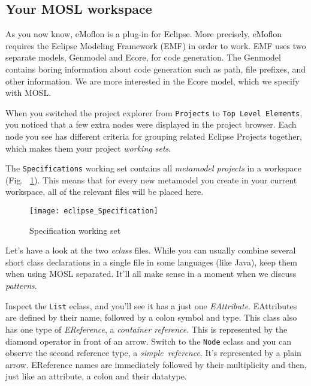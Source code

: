 \newpage
\texHeader

\subsection{Your MOSL workspace}

\hypertarget{projectStructure tex}{}
As you now know, eMoflon is a plug-in for Eclipse. More precisely, eMoflon requires the Eclipse Modeling Framework (EMF) in order to work. EMF uses two separate
models, Genmodel and Ecore, for code generation. The Genmodel contains boring information about code generation such as path, file prefixes, and other
information. We are more interested in the Ecore model, which we specify with MOSL.

When you switched the project explorer from \texttt{Projects} to \texttt{Top Level Elements}, you noticed that a few extra nodes were displayed in the project
browser. Each node you see has different criteria for grouping related Eclipse Projects together, which makes them your project \emph{working sets}.

The \texttt{Specifications} working set contains all \emph{metamodel projects} in a workspace (Fig. ~\ref{fig_modelSpecification}). This means that for every
new metamodel you create in your current workspace, all of the relevant files will be placed here.

 \begin{figure}[htbp]
  \centering
  \texttt{[image: eclipse\_Specification]}
  \caption{Specification working set}
  \label{fig_modelSpecification}
\end{figure}
  
Let's have a look at the two \emph{eclass} files. While you can usually combine several short class declarations in a single file in some languages (like Java),
keep them when using MOSL separated. It'll all make sense in a moment when we discuss \emph{patterns}.


Inspect the \texttt{List} eclass, and you'll see it has a just one \emph{EAttribute}. EAttributes are defined by their name, followed by a colon symbol and
type. This class also has one type of \emph{EReference}, a \emph{container reference}. This is represented by the diamond operator in front of an arrow. Switch
to the \texttt{Node} eclass and you can observe the second reference type, a \emph{simple~reference}. It's represented by a plain arrow. EReference names are
immediately followed by their multiplicity and then, just like an attribute, a colon and their datatype.

